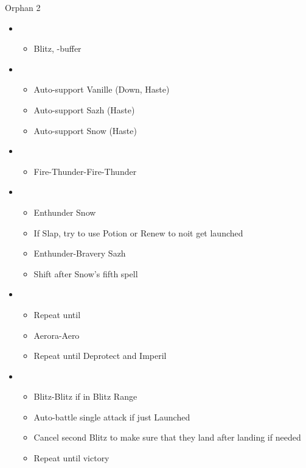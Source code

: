 \documentclass{report}
\begin{document}
\begin{battle}{Orphan 2}
\begin{itemize}
    \item \second
    \begin{itemize}
        \item Blitz, \syn-buffer
    \end{itemize}
    \item \fourth
    \begin{itemize}
        \item Auto-support Vanille (Down, Haste)
        \item Auto-support Sazh (Haste)
        \item Auto-support Snow (Haste)
    \end{itemize}
    \item \sixth
    \begin{itemize}
        \item Fire-Thunder-Fire-Thunder
    \end{itemize}
    \item \fourth
    \begin{itemize}
        \item Enthunder Snow
        \item If Slap, try to use Potion or Renew to noit get launched
        \item Enthunder-Bravery Sazh
        \item Shift after Snow's fifth spell
    \end{itemize}
    \item \fifth
    \begin{itemize}
        \item Repeat until \stagger
        \item Aerora-Aero
        \item Repeat until Deprotect and Imperil
    \end{itemize}
    \item \first
    \begin{itemize}
        \item Blitz-Blitz if in Blitz Range
        \item Auto-battle single attack if just Launched
        \item Cancel second Blitz to make sure that they land after landing if needed
        \item Repeat until victory
    \end{itemize}
\end{itemize}
\end{battle}
\end{document}
